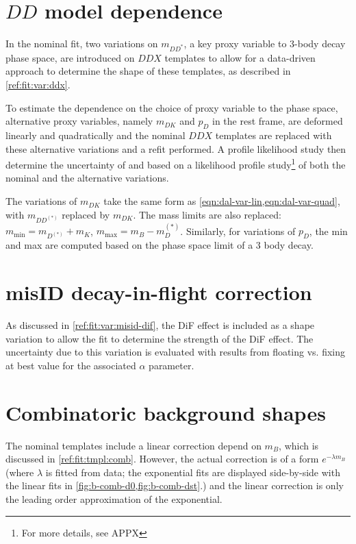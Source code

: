 \section{$DD$ model dependence}
\label{sys-model-ddx}

In the nominal fit, two variations on $m_{DD^{*}}$,
a key proxy variable to 3-body decay phase space,
are introduced on $DDX$ templates to allow for a data-driven approach to
determine the shape of these templates, as described in
\cref{ref:fit:var:ddx}.

To estimate the dependence on the choice of proxy variable to the phase space,
alternative proxy variables, namely $m_{DK}$ and $p_D$ in the \B rest frame,
are deformed linearly and quadratically and the nominal $DDX$ templates are
replaced with these alternative variations and a refit performed.
A profile likelihood study then determine the uncertainty of \RD and \RDst
based on a likelihood profile study\footnote{
    For more details, see APPX %
} of both the nominal and the alternative variations.

The variations of $m_{DK}$ take the same form as
\cref{eqn:dal-var-lin,eqn:dal-var-quad}, with $m_{DD^{(*)}}$ replaced by
$m_{DK}$.
The mass limits are also replaced:
$m_\text{min} = m_{D^{(*)}} + m_K$, $m_\text{max} = m_B - m_D^{(*)}$.
Similarly, for variations of $p_D$, the min and max are computed based on the
phase space limit of a 3 body decay.


\section{\muon misID decay-in-flight correction}
\label{sys-model-dif}

As discussed in \cref{ref:fit:var:misid-dif},
the DiF effect is included as a shape variation to allow the fit to determine
the strength of the DiF effect.
The uncertainty due to this variation is evaluated with results
from floating vs. fixing at best value for the associated $\alpha$ parameter.


\section{Combinatoric background shapes}
\label{sys-model-comb}

The nominal \BComb templates include a linear correction depend on $m_B$,
which is discussed in \cref{ref:fit:tmpl:comb}.
However, the actual correction is of a form $e^{-\lambda m_B}$
(where $\lambda$ is fitted from data;
the exponential fits are displayed side-by-side with the linear fits in
\cref{fig:b-comb-d0,fig:b-comb-dst}.)
and the linear correction is only the leading order approximation of the
exponential.

